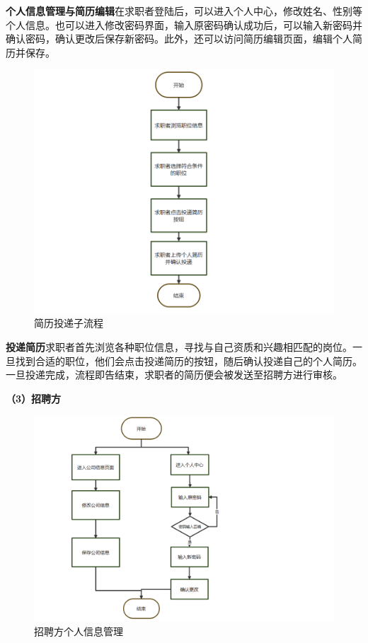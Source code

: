 \documentclass[UTF8,a4paper,10pt]{ctexart}
\begin{document}
\textbf{个人信息管理与简历编辑}\space 在求职者登陆后，可以进入个人中心，修改姓名、性别等个人信息。也可以进入修改密码界面，输入原密码确认成功后，可以输入新密码并确认密码，确认更改后保存新密码。此外，还可以访问简历编辑页面，编辑个人简历并保存。
\begin{figure}[H]
    \centering
    \includegraphics[width=\textwidth]{img/简历投递子流程.png}
    \caption{简历投递子流程}
    \label{fig:简历投递子流程}
\end{figure}

\textbf{投递简历}\space 求职者首先浏览各种职位信息，寻找与自己资质和兴趣相匹配的岗位。一旦找到合适的职位，他们会点击投递简历的按钮，随后确认投递自己的个人简历。一旦投递完成，流程即告结束，求职者的简历便会被发送至招聘方进行审核。

\textbf{（3）招聘方} \\
\begin{figure}[H]
    \centering
    \includegraphics[width=\textwidth]{img/招聘方个人信息管理.png}
    \caption{招聘方个人信息管理}
    \label{fig:招聘方个人信息管理}
\end{figure}
\end{document}
